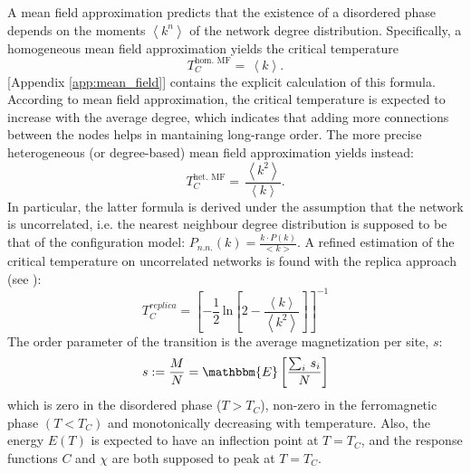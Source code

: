 \noindent A mean field approximation predicts that the existence of a disordered phase depends on the moments $\left\langle k^n\right\rangle$ of the network degree distribution. Specifically, a homogeneous mean field approximation yields the critical temperature
\begin{equation} \label{eq:hom_mean_field}
    T_C^{\text{hom. MF}} =\,\left\langle k \right \rangle.
\end{equation}
[Appendix \ref{app:mean_field}] contains the explicit calculation of this formula. According to mean field approximation, the critical temperature is expected to increase with the average degree, which indicates that adding more connections between the nodes helps in mantaining long-range order. The more precise heterogeneous (or degree-based) mean field approximation yields instead:
\begin{equation} \label{eq:het_mean_field}
    T_C^{\text{het. MF}} =\,\frac{\left\langle k^2 \right \rangle}{\left\langle k \right \rangle}.
\end{equation}
In particular, the latter formula is derived under the assumption that the network is uncorrelated, i.e. the nearest neighbour degree distribution is supposed to be that of the configuration model: $P_{n.n.} (k)=\frac{k\cdot P(k)}{<k>}$.
A refined estimation of the critical temperature on uncorrelated networks is found with the replica approach (see \cite{analytical_ising}): 
\begin{equation}
    T_C^{replica} = \left[ -\frac{1}{2}\,\text{ln}\left[2- \frac{\left\langle k \right\rangle}{\left\langle k^2 \right\rangle}\right]\right]^{-1}
\label{eq:replica}    
\end{equation}
The order parameter of the transition is the average magnetization per site, $s$:
$$
s := \frac{M}{N} = \mathbbm{E}\left[\frac{\sum_{i}\,s_i}{N}\right]
$$
which is zero in the disordered phase ($T>T_C$), non-zero in the ferromagnetic  phase $(T<T_C)$ and monotonically decreasing with temperature. Also, the energy $E(T)$ is expected to have an inflection point at $T=T_C$, and the response functions $C$ and $\chi$ are both supposed to peak at $T=T_C$.

